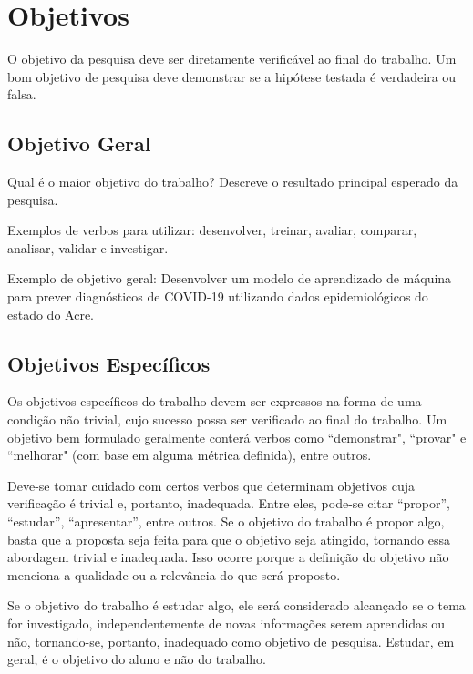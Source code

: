 \documentclass[
	12pt,				    %
	openright,			    %
	oneside,			    %
	a4paper,			    %
    sumario=tradicional,    %
	english,			    %
	brazil,				    %
	]{abntex2}
\begin{document}
\section{Objetivos}\label{sec:objetivos}

O objetivo da pesquisa deve ser diretamente verificável ao final do trabalho. Um bom objetivo de pesquisa deve demonstrar se a hipótese testada é verdadeira ou falsa.

\subsection{Objetivo Geral}\label{sec:ObjGeral}

Qual é o maior objetivo do trabalho? Descreve o resultado principal esperado da pesquisa.

Exemplos de verbos para utilizar: desenvolver, treinar, avaliar, comparar, analisar, validar e investigar.

Exemplo de objetivo geral: Desenvolver um modelo de aprendizado de máquina para prever diagnósticos de COVID-19 utilizando dados epidemiológicos do estado do Acre.

\subsection{Objetivos Específicos}\label{sec:ObjEspec}

Os objetivos específicos do trabalho devem ser expressos na forma de uma condição não trivial, cujo sucesso possa ser verificado ao final do trabalho. Um objetivo bem formulado geralmente conterá verbos como ``demonstrar", ``provar" e ``melhorar" (com base em alguma métrica definida), entre outros.

Deve-se tomar cuidado com certos verbos que determinam objetivos cuja verificação é trivial e, portanto, inadequada. Entre eles, pode-se citar ``propor'', ``estudar'', ``apresentar'', entre outros. Se o objetivo do trabalho é propor algo, basta que a proposta seja feita para que o objetivo seja atingido, tornando essa abordagem trivial e inadequada. Isso ocorre porque a definição do objetivo não menciona a qualidade ou a relevância do que será proposto.

Se o objetivo do trabalho é estudar algo, ele será considerado alcançado se o tema for investigado, independentemente de novas informações serem aprendidas ou não, tornando-se, portanto, inadequado como objetivo de pesquisa. Estudar, em geral, é o objetivo do aluno e não do trabalho.
\end{document}
